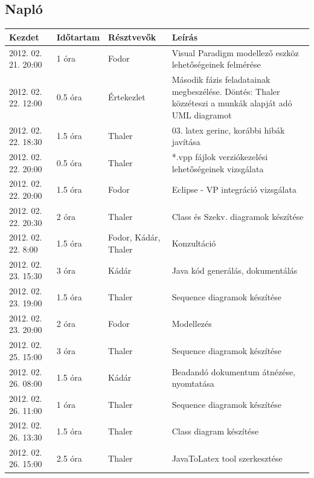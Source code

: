 	\subsection{Napló}
    \begin{center} 
        \begin{tabular}{| l | p{1.9cm} | p{2.6cm} | p{6.1cm} |}
            \hline
                Kezdet & Időtartam & Résztvevők & Leírás \\
            \hline \hline 
2012. 02. 21. 20:00 & 1 óra & Fodor & Visual Paradigm modellező eszköz lehetőségeinek felmérése\\ \hline
2012. 02. 22. 12:00 & 0.5 óra & Értekezlet & Második fázis feladatainak megbeszélése. Döntés: Thaler közzéteszi a munkák alapját adó UML diagramot\\ \hline
2012. 02. 22. 18:30 & 1.5 óra & Thaler & 03. latex gerinc, korábbi hibák javítása\\ \hline
2012. 02. 22. 20:00 & 0.5 óra & Thaler & *.vpp fájlok verziókezelési lehetőségeinek vizsgálata\\ \hline
2012. 02. 22. 20:00 & 1.5 óra & Fodor & Eclipse - VP integráció vizsgálata\\ \hline
2012. 02. 22. 20:30 & 2 óra & Thaler & Class és Szekv. diagramok készítése\\ \hline
2012. 02. 22. 8:00 & 1.5 óra & Fodor, Kádár, Thaler & Konzultáció\\ \hline
2012. 02. 23. 15:30 & 3 óra & Kádár & Java kód generálás, dokumentálás\\ \hline
2012. 02. 23. 19:00 & 1.5 óra & Thaler & Sequence diagramok készítése\\ \hline
2012. 02. 23. 20:00 & 2 óra & Fodor & Modellezés\\ \hline
2012. 02. 25. 15:00 & 3 óra & Thaler & Sequence diagramok készítése\\ \hline
2012. 02. 26. 08:00 & 1.5 óra & Kádár & Beadandó dokumentum átnézése, nyomtatása\\ \hline
2012. 02. 26. 11:00 & 1 óra & Thaler & Sequence diagramok készítése\\ \hline
2012. 02. 26. 13:30 & 1.5 óra & Thaler & Class diagram készítése\\ \hline
2012. 02. 26. 15:00 & 2.5 óra & Thaler & JavaToLatex tool szerkesztése\\ \hline

\end{tabular}
\end{center}
